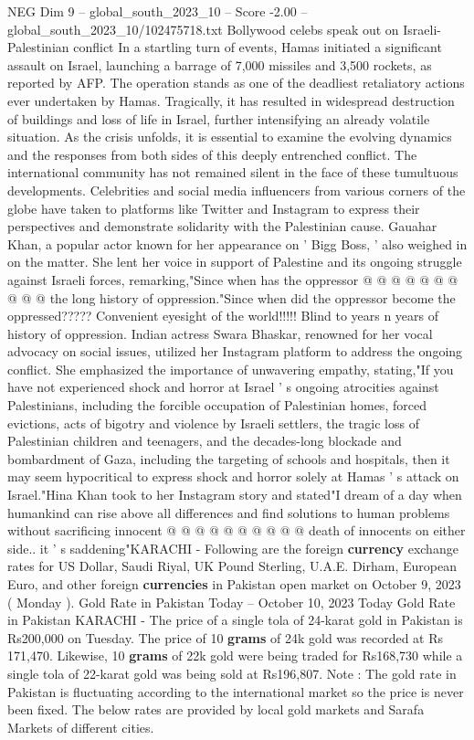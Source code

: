 \begin{textsample}{NEG Dim 9 – global\_south\_2023\_10 – Score -2.00 – global\_south\_2023\_10/102475718.txt}  \label{ex:f9_neg_422}
Bollywood celebs speak out on Israeli-Palestinian conflict In a startling turn of events, Hamas initiated a significant assault on Israel, launching a barrage of 7,000 missiles and 3,500 rockets, as reported by AFP.
The operation stands as one of the deadliest retaliatory actions ever undertaken by Hamas.
Tragically, it has resulted in widespread destruction of buildings and loss of life in Israel, further intensifying an already volatile situation.
As the crisis unfolds, it is essential to examine the evolving dynamics and the responses from both sides of this deeply entrenched conflict.
The international community has not remained silent in the face of these tumultuous developments.
Celebrities and social media influencers from various corners of the globe have taken to platforms like Twitter and Instagram to express their perspectives and demonstrate solidarity with the Palestinian cause.
Gauahar Khan, a popular actor known for her appearance on ' Bigg Boss, ' also weighed in on the matter.
She lent her voice in support of Palestine and its ongoing struggle against Israeli forces, remarking,"Since when has the oppressor @ @ @ @ @ @ @ @ @ @ the long history of oppression."Since when did the oppressor become the oppressed?????
Convenient eyesight of the world!!!!!
Blind to years n years of history of oppression.
Indian actress Swara Bhaskar, renowned for her vocal advocacy on social issues, utilized her Instagram platform to address the ongoing conflict.
She emphasized the importance of unwavering empathy, stating,"If you have not experienced shock and horror at Israel ' s ongoing atrocities against Palestinians, including the forcible occupation of Palestinian homes, forced evictions, acts of bigotry and violence by Israeli settlers, the tragic loss of Palestinian children and teenagers, and the decades-long blockade and bombardment of Gaza, including the targeting of schools and hospitals, then it may seem hypocritical to express shock and horror solely at Hamas ' s attack on Israel."Hina Khan took to her Instagram story and stated"I dream of a day when humankind can rise above all differences and find solutions to human problems without sacrificing innocent @ @ @ @ @ @ @ @ @ @ death of innocents on either side.. it ' s saddening"KARACHI - Following are the foreign \textbf{currency} exchange rates for US Dollar, Saudi Riyal, UK Pound Sterling, U.A.E.
Dirham, European Euro, and other foreign \textbf{currencies} in Pakistan open market on October 9, 2023 ( Monday ).
Gold Rate in Pakistan Today -- October 10, 2023 Today Gold Rate in Pakistan KARACHI - The price of a single tola of 24-karat gold in Pakistan is Rs200,000 on Tuesday.
The price of 10 \textbf{grams} of 24k gold was recorded at Rs 171,470.
Likewise, 10 \textbf{grams} of 22k gold were being traded for Rs168,730 while a single tola of 22-karat gold was being sold at Rs196,807.
Note : The gold rate in Pakistan is fluctuating according to the international market so the price is never been fixed.
The below rates are provided by local gold markets and Sarafa Markets of different cities.

\end{textsample}
